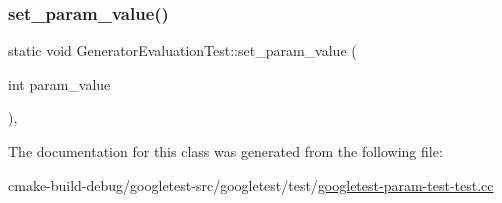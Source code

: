 \mbox{\label{classGeneratorEvaluationTest_ae4f5fb96577dd680d9fa1fd6c3c4af46}} 
\subsubsection{\texorpdfstring{set\_param\_value()}{set\_param\_value()}}
{\footnotesize\ttfamily static void Generator\+Evaluation\+Test\+::set\+\_\+param\+\_\+value (\begin{DoxyParamCaption}\item[{int}]{param\+\_\+value }\end{DoxyParamCaption})\hspace{0.3cm}{\ttfamily [inline]}, {\ttfamily [static]}}



The documentation for this class was generated from the following file\+:\begin{DoxyCompactItemize}
\item 
cmake-\/build-\/debug/googletest-\/src/googletest/test/\mbox{\hyperlink{googletest-param-test-test_8cc}{googletest-\/param-\/test-\/test.\+cc}}\end{DoxyCompactItemize}
